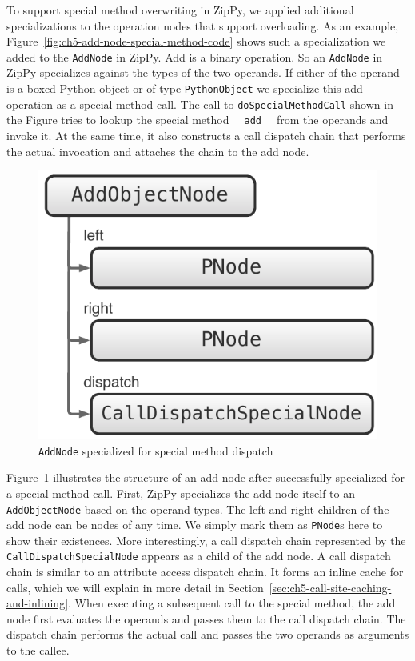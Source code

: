 To support special method overwriting in ZipPy, we applied additional specializations to the operation nodes that support overloading.
As an example, Figure~\ref{fig:ch5-add-node-special-method-code} shows such a specialization we added to the \texttt{AddNode} in ZipPy.
Add is a binary operation.
So an \texttt{AddNode} in ZipPy specializes against the types of the two operands.
If either of the operand is a boxed Python object or of type \texttt{PythonObject} we specialize this add operation as a special method call.
The call to \texttt{doSpecialMethodCall} shown in the Figure tries to lookup the special method \texttt{\_\_add\_\_} from the operands and invoke it.
At the same time, it also constructs a call dispatch chain that performs the actual invocation and attaches the chain to the add node.

\begin{figure}
\centering
\includegraphics[scale=.5]{figures/ch5-add-node-with-special-dispatch}
\caption{\texttt{AddNode} specialized for special method dispatch}
\label{fig:ch5-add-node-with-special-dispatch}
\end{figure}

Figure~\ref{fig:ch5-add-node-with-special-dispatch} illustrates the structure of an add node after successfully specialized for a special method call.
First, ZipPy specializes the add node itself to an \texttt{AddObjectNode} based on the operand types.
The left and right children of the add node can be nodes of any time.
We simply mark them as \texttt{PNode}s here to show their existences.
More interestingly, a call dispatch chain represented by the \texttt{CallDispatchSpecialNode} appears as a child of the add node.
A call dispatch chain is similar to an attribute access dispatch chain.
It forms an inline cache for calls, which we will explain in more detail in Section~\ref{sec:ch5-call-site-caching-and-inlining}.
When executing a subsequent call to the special method, the add node first evaluates the operands and passes them to the call dispatch chain.
The dispatch chain performs the actual call and passes the two operands as arguments to the callee.

